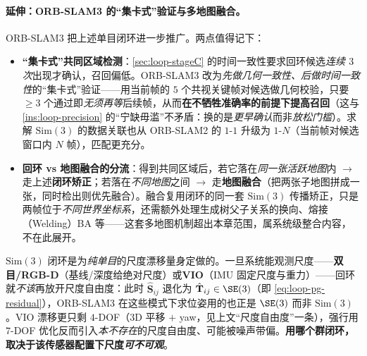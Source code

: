 \paragraph{延伸：ORB-SLAM3 的“集卡式”验证与多地图融合。}
ORB-SLAM3 把上述单目闭环进一步推广\cite{campos2021orbslam3}。两点值得记下：
\begin{itemize}
  \item \textbf{“集卡式”共同区域检测}：\cref{sec:loop-stageC} 的时间一致性要求回环候选\emph{连续 $3$ 次}出现才确认，召回偏低。ORB-SLAM3 改为\emph{先做几何一致性、后做时间一致性}的“集卡式”验证——用当前帧的 $5$ 个共视关键帧对候选做几何校验，只要 $\ge 3$ 个通过即\emph{无须再等}后续帧，从而\textbf{在不牺牲准确率的前提下提高召回}（这与 \cref{ins:loop-precision} 的“宁缺毋滥”不矛盾：换的是\emph{更早确认}而非\emph{放松门槛}）。求解 $\mathrm{Sim}(3)$ 的数据关联也从 ORB-SLAM2 的 $1$-$1$ 升级为 $1$-$N$（当前帧对候选窗口内 $N$ 帧），匹配更充分。
  \item \textbf{回环 vs 地图融合的分流}：得到共同区域后，若它落在\emph{同一张活跃地图}内 $\to$ 走上述\textbf{闭环矫正}；若落在\emph{不同地图}之间 $\to$ 走\textbf{地图融合}（把两张子地图拼成一张，同时检出则优先融合）。融合复用闭环的同一套 $\mathrm{Sim}(3)$ 传播矫正，只是两帧位于\emph{不同世界坐标系}，还需额外处理生成树父子关系的换向、熔接（Welding）BA 等——这套多地图机制超出本章范围，属系统级整合内容，不在此展开。
\end{itemize}

\begin{pitfall}
$\mathrm{Sim}(3)$ 闭环是为\emph{纯单目}的尺度漂移量身定做的。一旦系统能观测尺度——\textbf{双目/RGB-D}（基线/深度给绝对尺度）或\textbf{VIO}（IMU 固定尺度与重力）——回环就\emph{不该}再放开尺度自由度：此时 $\hat{\mathbf S}_{ij}$ 退化为 $\hat{\mathbf T}_{ij}\in\SE(3)$（即 \cref{eq:loop-pg-residual}），ORB-SLAM3 在这些模式下求位姿用的也正是 $\SE(3)$ 而非 $\mathrm{Sim}(3)$\cite{campos2021orbslam3}。VIO 漂移更只剩 $4$-DOF（$3$D 平移 $+$ yaw，见上文“尺度自由度”一条），强行用 $7$-DOF 优化反而引入\emph{本不存在}的尺度自由度、可能被噪声带偏。\textbf{用哪个群闭环，取决于该传感器配置下尺度\emph{可不可观}}。
\end{pitfall}

